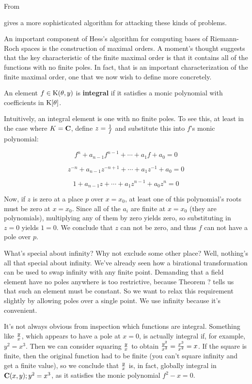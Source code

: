 From \cite{bronstein algebraic curve}
\endexample

\cite{bronstein algebraic curve} gives a more sophisticated algorithm for attacking these
kinds of problems.



An important component of Hess's algorithm for computing bases of
Riemann-Roch spaces is the construction of maximal orders.  A moment's
thought suggests that the key characteristic of the finite maximal
order is that it contains all of the functions with no finite poles.
In fact, that is an important characterization of the finite
maximal order, one that we now wish to define more concretely.


An element $f \in {\rm K}(\theta,y)$ is {\bf integral} if it satisfies
a monic polynomial with coefficients in ${\rm K}[\theta]$.

\enddefinition

Intuitively, an integral element is one with no finite poles.
To see this, at least in the case where $K = {\bf C}$, define
$z = {1 \over f}$ and substitute this into $f$'s monic polynomial:

	$$f^n + a_{n-1} f^{n-1} + \cdots + a_1 f + a_0 = 0$$

	$$z^{-n} + a_{n-1} z^{-n+1} + \cdots + a_1 z^{-1} + a_0 = 0$$

	$$1 + a_{n-1} z + \cdots + a_1 z^{n-1} + a_0 z^n = 0$$

Now, if $z$ is zero at a place $p$ over $x=x_0$, at least one of this
polynomial's roots must be zero at $x=x_0$.  Since all of the $a_i$
are finite at $x=x_0$ (they are polynomials), multiplying any of them
by zero yields zero, so substituting in $z=0$ yields $1=0$. We
conclude that $z$ can not be zero, and thus $f$ can not have a pole
over $p$.

What's special about infinity?  Why not exclude some other place?
Well, nothing's all that special about infinity.  We've already seen
how a birational transformation can be used to swap infinity with any
finite point.  Demanding that a field element have no poles anywhere
is too restrictive, because Theorem ? tells us that such an element
must be constant.  So we want to relax this requirement slightly by
allowing poles over a single point.  We use infinity because it's
convenient.

It's not always obvious from inspection which functions are integral.
Something like $y \over x$, which appears to have a pole at $x=0$, is
actually integral if, for example, $y^2=x^3$.  Then we can consider
squaring $y \over x$ to obtain ${y^2 \over x^2} = {x^3 \over x^2} =
x$.  If the square is finite, then the original function had to be
finite (you can't square infinity and get a finite value), so we
conclude that $y \over x$ is, in fact, globally integral in ${\bf
C}(x,y); y^2=x^3$, as it satisfies the monic polynomial $f^2 - x = 0$.

